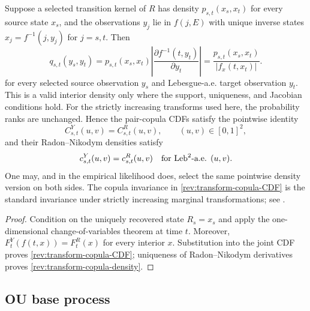 \begin{proposition}
\label{rev:prop-transform-density}
Suppose a selected transition kernel of $R$ has density
$p_{s,t}(x_s,x_t)$ for every source state $x_s$, and the observations $y_j$
lie in $f(j,E)$ with unique inverse states
$x_j=f^{-1}(j,y_j)$ for $j=s,t$.  Then
\begin{equation}
q_{s,t}(y_s,y_t)=p_{s,t}(x_s,x_t)
\left|\frac{\partial f^{-1}(t,y_t)}{\partial y_t}\right|
=\frac{p_{s,t}(x_s,x_t)}{|f_x(t,x_t)|}.
\label{rev:transform-density}
\end{equation}
for every selected source observation $y_s$ and Lebesgue-a.e. target
observation $y_t$.  This is a valid interior density only where the support,
uniqueness, and Jacobian conditions hold.  For the strictly increasing
transforms used here, the probability ranks are unchanged.  Hence the
pair-copula CDFs satisfy the pointwise identity
\begin{equation}
C^Y_{s,t}(u,v)=C^R_{s,t}(u,v),
\qquad (u,v)\in[0,1]^2,
\label{rev:transform-copula-CDF}
\end{equation}
and their Radon--Nikodym densities satisfy
\begin{equation}
c^Y_{s,t}(u,v)=c^R_{s,t}(u,v)
\quad\text{for $\operatorname{Leb}^2$-a.e. }(u,v).
\label{rev:transform-copula-density}
\end{equation}
One may, and in the empirical likelihood does, select the same pointwise
density version on both sides.  The copula invariance in
\eqref{rev:transform-copula-CDF} is the standard invariance under strictly
increasing marginal transformations; see \citet[Chapter~2]{Nelsen2006}.
\end{proposition}

\begin{proof}
Condition on the uniquely recovered state $R_s=x_s$ and apply the
one-dimensional change-of-variables theorem at time $t$.  Moreover,
$F_t^Y(f(t,x))=F_t^R(x)$ for every interior $x$.  Substitution into the joint
CDF proves \eqref{rev:transform-copula-CDF}; uniqueness of
Radon--Nikodym derivatives proves \eqref{rev:transform-copula-density}.
\end{proof}

\subsection{OU base process}

